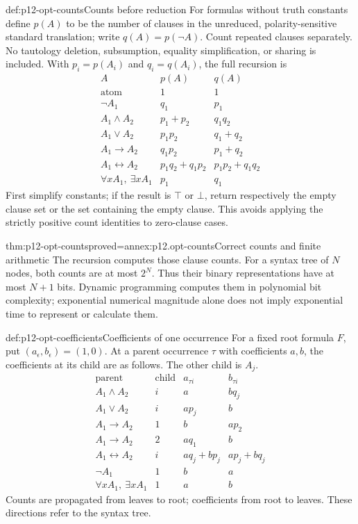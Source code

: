\begin{hbdefinition}{def:p12-opt-counts}{Counts before reduction}
For formulas without truth constants define \(p(A)\) to be the number
of clauses in the unreduced, polarity-sensitive standard translation;
write \(q(A)=p(\neg A)\). Count repeated clauses separately. No
tautology deletion, subsumption, equality simplification, or sharing
is included. With \(p_i=p(A_i)\) and \(q_i=q(A_i)\), the full recursion is
\[
\begin{array}{c|cc}
A&p(A)&q(A)\\ \hline
\text{atom}&1&1\\
\neg A_1&q_1&p_1\\
A_1\land A_2&p_1+p_2&q_1q_2\\
A_1\lor A_2&p_1p_2&q_1+q_2\\
A_1\to A_2&q_1p_2&p_1+q_2\\
A_1\leftrightarrow A_2&p_1q_2+q_1p_2&p_1p_2+q_1q_2\\
\forall xA_1,\ \exists xA_1&p_1&q_1
\end{array}
\]
First simplify constants; if the result is \(\top\) or \(\bot\),
return respectively the empty clause set or the set containing the
empty clause. This avoids applying the strictly positive count
identities to zero-clause cases.
\end{hbdefinition}

\begin{hbtheorem}{thm:p12-opt-counts}{proved=annex:p12.opt-counts}{Correct counts and finite arithmetic}
The recursion computes those clause counts. For a syntax tree of
\(N\) nodes, both counts are at most \(2^N\).
Thus their binary representations have at most \(N+1\) bits.
Dynamic programming computes them in polynomial bit complexity;
exponential numerical magnitude alone does not imply exponential
time to represent or calculate them.
\end{hbtheorem}

\begin{hbdefinition}{def:p12-opt-coefficients}{Coefficients of one occurrence}
For a fixed root formula \(F\), put \((a_\epsilon,b_\epsilon)=(1,0)\).
At a parent occurrence \(\tau\) with coefficients \(a,b\), the
coefficients at its child are as follows. The other child is \(A_j\).
\[
\begin{array}{c|c|cc}
\text{parent}&\text{child}&a_{\tau i}&b_{\tau i}\\ \hline
A_1\land A_2&i&a&bq_j\\
A_1\lor A_2&i&ap_j&b\\
A_1\to A_2&1&b&ap_2\\
A_1\to A_2&2&aq_1&b\\
A_1\leftrightarrow A_2&i&aq_j+bp_j&ap_j+bq_j\\
\neg A_1&1&b&a\\
\forall xA_1,\ \exists xA_1&1&a&b
\end{array}
\]
Counts are propagated from leaves to root; coefficients from root to
leaves. These directions refer to the syntax tree.
\end{hbdefinition}

